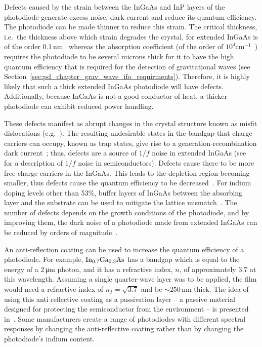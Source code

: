 \par
Defects caused by the strain between the InGaAs and InP layers of the photodiode generate excess noise, dark current and reduce its quantum efficiency\cite{Joshi1993}. The photodiode can be made thinner to reduce this strain. The critical thickness, i.e.~the thickness above which strain degrades the crystal, for extended InGaAs is of the order 0.1\,nm~\cite{Gendry1992} whereas the absorption coefficient (of the order of $10^4\si{\centi\metre^{-1}}$~\cite{Alam2007}) requires the photodiode to be several microns thick for it to have the high quantum efficiency that is required for the detection of gravitational waves (see Section~\ref{sec:pd_chapter_grav_wave_ifo_requirments}). Therefore, it is highly likely that such a thick extended InGaAs photodiode will have defects. Additionally, because InGaAs is not a good conductor of heat, a thicker photodiode can exhibit reduced power handling\cite{Li2004}. 
\par
These defects manifest as abrupt changes in the crystal structure known as misfit dislocations (e.g.~\cite{Uchida1993,Jurczak2017}). The resulting undesirable states in the bandgap that charge carriers can occupy, known as trap states, give rise to a generation-recombination dark current~\cite{Zimmermann2003}; thus, defects are a source of $1/f$ noise in extended InGaAs (see~\cite{Hooge1981} for a description of $1/f$ noise in semiconductors). Defects cause there to be more free charge carriers in the InGaAs. This leads to the depletion region becoming smaller, thus defects cause the quantum efficiency to be decreased~\cite{DextquotesingleHondt}. For indium doping levels other than 53\%, buffer layers of InGaAs between the absorbing layer and the substrate can be used to mitigate the lattice mismatch~\cite{Zimmermann2003}. The number of defects depends on the growth conditions of the photodiode, and by improving them, the dark noise of a photodiode made from extended InGaAs can be reduced by orders of magnitude~\cite{Chen2018}. 
\par
An anti-reflection coating can be used to increase the quantum efficiency of a photodiode. For example, $\rm{In_{0.7}Ga_{0.3}As}$ has a bandgap which is equal to the energy of a 2\,\si{\micro\metre} photon, and it has a refractive index, $n$, of approximately $3.7$ at this wavelength. Assuming a single quarter-wave layer was to be applied, the film would need a refractive index of $n_f = \sqrt{3.7}$ and be $\sim\!250\,\si{\nano\meter}$ thick. The idea of using this anti reflective coating as a passivation layer -- a passive material designed for protecting the semiconductor from the environment -- is presented in~\cite{L_pez_2007}. Some manufacturers create a range of photodiodes with different spectral responses by changing the anti-reflective coating rather than by changing the photodiode's indium content\cite{Gasparian2018}.
